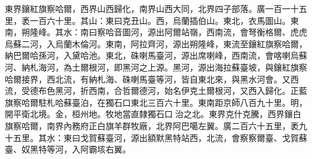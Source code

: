 \begin{pinyinscope}
東界鑲紅旗察哈爾，西界山西歸化，南界山西大同，北界四子部落。廣一百一十五里，袤一百六十里。其山：東曰克丑山。西，烏蘭插伯山。東北，衣馬圖山。東南，朔隆峰。其水：南曰察哈音圖河，源出阿爾站嶺，西南流，會弩衡格爾、虎虎烏蘇二河，入烏蘭木倫河。東南，阿拉齊河，源出朔隆峰，東流至鑲紅旗察哈爾，納巴爾哈孫河，入黛哈池。東北，硃喇馬臺河，源出席喇峰，西南流，會喀喇烏蘇河、納札海河，為土爾根河，即黑河之上源。黑河，源出海拉蘇臺坡，與鑲紅旗察哈爾接界，西北流，有納札海、硃喇馬臺等河，皆自東北來，與黑水河會。又西流，受德布色黑河，折西南，合哲爾德河，始名伊克土爾根河，又西入歸化。正藍旗察哈爾駐札哈蘇臺泊，在獨石口東北三百六十里。東南距京師八百九十里。明，開平衛北境。金，桓州地。牧地當直隸獨石口治之北。東界克什克騰，西界鑲白旗察哈爾，南界內務府正白旗羊群牧廠，北界阿巴噶左翼。廣二百六十五里，袤九十五里。其水：東曰戈賀蘇臺河，源出額默黑特站西，北流，會察察爾臺、戈賀蘇臺、奴黑特等河，入阿霸垓右翼。


\end{pinyinscope}
